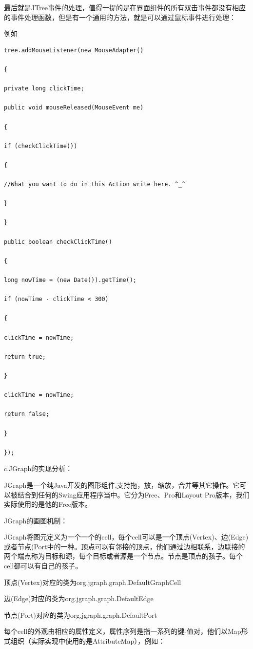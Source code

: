 \documentclass[a4paper,unicode=true,xetex]{article}
\begin{document}
最后就是JTree事件的处理，值得一提的是在界面组件的所有双击事件都没有相应的事件处理函数，但是有一个通用的方法，就是可以通过鼠标事件进行处理：

例如
\begin{lstlisting}
tree.addMouseListener(new MouseAdapter()

{

private long clickTime;

public void mouseReleased(MouseEvent me)

{

if (checkClickTime())

{

//What you want to do in this Action write here. ^_^

}

}

public boolean checkClickTime()

{

long nowTime = (new Date()).getTime();

if (nowTime - clickTime < 300)

{

clickTime = nowTime;

return true;

}

clickTime = nowTime;

return false;

}

});
\end{lstlisting}

c.JGraph的实现分析：

JGraph是一个纯Java开发的图形组件,支持拖，放，缩放，合并等其它操作。它可以被结合到任何的Swing应用程序当中。它分为Free、Pro和Layout Pro版本，我们实际使用的是他的Free版本。

JGraph的画图机制：

JGraph将图元定义为一个一个的cell，每个cell可以是一个顶点(Vertex)、边(Edge)或者节点(Port中的一种。顶点可以有邻接的顶点，他们通过边相联系，边联接的两个端点称为目标和源，每个目标或者源是一个节点。节点是顶点的孩子。每个cell都可以有自己的孩子。

顶点(Vertex)对应的类为org.jgraph.graph.DefaultGraphCell

边(Edge)对应的类为org.jgraph.graph.DefaultEdge

节点(Port)对应的类为org.jgraph.graph.DefaultPort

每个cell的外观由相应的属性定义，属性序列是指一系列的键-值对，他们以Map形式组织（实际实现中使用的是AttributeMap），例如：
\end{document}
